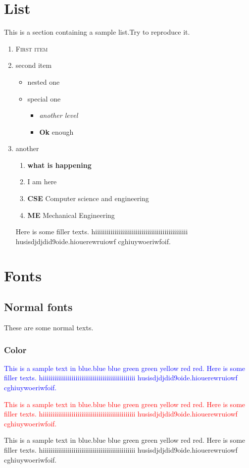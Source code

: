 \documentclass[14pt, a4paper]{article}
\begin{document}
	\section{List}
	This is a section containing a sample list.Try to reproduce it.
	\begin{enumerate}
    \item \textsc{First item} 
    \item second item
    \begin{itemize}
        \item nested one
        \item[] special one
        \begin{itemize}
            \item \textit{another level}
            \item \textbf{Ok} enough
        \end{itemize}
    \end{itemize}
    \item another
    \begin{enumerate}
        \item \textbf{what is happening}
        \item[] I am here
        \item[] \textbf{CSE} Computer science and engineering
        \item[] \textbf{ME} Mechanical Engineering
    \end{enumerate}
    Here is some filler texts. hiiiiiiiiiiiiiiiiiiiiiiiiiiiiiiiiiiiiiiiiiiiiiiii husisdjdjdid9oide.hiouerewruiowf cghiuywoeriwfoif.
    \end{enumerate}
    \section{Fonts}
    \subsection{Normal fonts}
    These are some normal texts.
    \subsubsection{Color}
    \textcolor{blue}{This is a sample text in blue.blue blue green green yellow red red. Here is some filler texts. hiiiiiiiiiiiiiiiiiiiiiiiiiiiiiiiiiiiiiiiiiiiiiiii husisdjdjdid9oide.hiouerewruiowf cghiuywoeriwfoif.}\par
    \textcolor{red}{This is a sample text in blue.blue blue green green yellow red red. Here is some filler texts. hiiiiiiiiiiiiiiiiiiiiiiiiiiiiiiiiiiiiiiiiiiiiiiii husisdjdjdid9oide.hiouerewruiowf cghiuywoeriwfoif.}\par
    This is a sample text in blue.blue blue green green yellow red red. Here is some filler texts. hiiiiiiiiiiiiiiiiiiiiiiiiiiiiiiiiiiiiiiiiiiiiiiii husisdjdjdid9oide.hiouerewruiowf cghiuywoeriwfoif.
    \pagebreak
\end{document}
